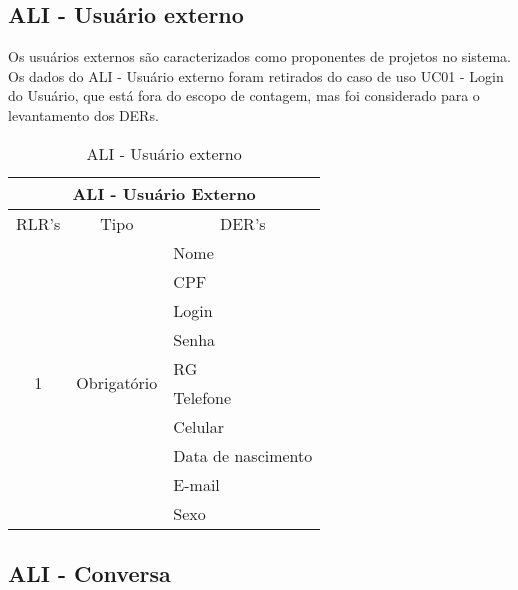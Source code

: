  
  \subsection{ALI - Usuário externo}
    
    Os usuários externos são caracterizados como proponentes de projetos no sistema.
    Os dados do ALI - Usuário externo foram retirados do caso de uso UC01 - Login do Usuário, que está fora do escopo 
    de contagem, mas foi considerado para o levantamento dos DERs.
    
    \begin{table}[!h]
    \centering
    \caption{ALI - Usuário externo}
    \label{ali_usuario_externo}
    \begin{tabular}{|c|c|l|}
    \hline
    \multicolumn{3}{|c|}{ALI - Usuário Externo}                                              \\ \hline
    \multicolumn{1}{|l|}{RLR's} & Tipo                          & \multicolumn{1}{c|}{DER's} \\ \hline
    \multirow{10}{*}{1}         & \multirow{10}{*}{Obrigatório} & Nome                       \\ \cline{3-3} 
				&                               & CPF                        \\ \cline{3-3} 
				&                               & Login                      \\ \cline{3-3} 
				&                               & Senha                      \\ \cline{3-3} 
				&                               & RG                         \\ \cline{3-3} 
				&                               & Telefone                   \\ \cline{3-3} 
				&                               & Celular                    \\ \cline{3-3} 
				&                               & Data de nascimento         \\ \cline{3-3} 
				&                               & E-mail                     \\ \cline{3-3} 
				&                               & Sexo                       \\ \hline
    \end{tabular}
    \end{table}
  
  \pagebreak
  \subsection{ALI - Conversa}
    
